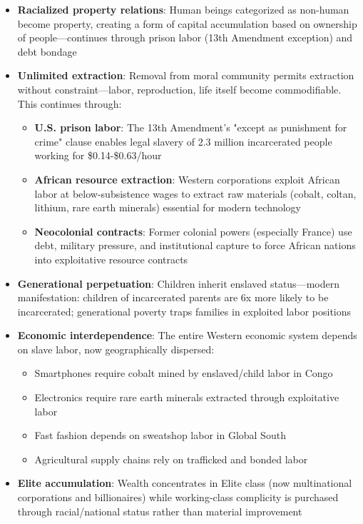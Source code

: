 \documentclass[12pt]{article}
\begin{document}
\begin{itemize}
    \item \textbf{Racialized property relations}: Human beings categorized as non-human become property, creating a form of capital accumulation based on ownership of people---continues through prison labor (13th Amendment exception) and debt bondage
    
    \item \textbf{Unlimited extraction}: Removal from moral community permits extraction without constraint---labor, reproduction, life itself become commodifiable. This continues through:
    \begin{itemize}
        \item \textbf{U.S. prison labor}: The 13th Amendment's "except as punishment for crime" clause enables legal slavery of 2.3 million incarcerated people working for \$0.14-\$0.63/hour
        \item \textbf{African resource extraction}: Western corporations exploit African labor at below-subsistence wages to extract raw materials (cobalt, coltan, lithium, rare earth minerals) essential for modern technology \cite{rodney}
        \item \textbf{Neocolonial contracts}: Former colonial powers (especially France) use debt, military pressure, and institutional capture to force African nations into exploitative resource contracts
    \end{itemize}
    
    \item \textbf{Generational perpetuation}: Children inherit enslaved status---modern manifestation: children of incarcerated parents are 6x more likely to be incarcerated; generational poverty traps families in exploited labor positions
    
    \item \textbf{Economic interdependence}: The entire Western economic system depends on slave labor, now geographically dispersed:
    \begin{itemize}
        \item Smartphones require cobalt mined by enslaved/child labor in Congo
        \item Electronics require rare earth minerals extracted through exploitative labor
        \item Fast fashion depends on sweatshop labor in Global South
        \item Agricultural supply chains rely on trafficked and bonded labor
    \end{itemize}
    
    \item \textbf{Elite accumulation}: Wealth concentrates in Elite class (now multi\-national corporations and billionaires) while working-class complicity is purchased through racial/national status rather than material improvement
\end{itemize}
\end{document}
